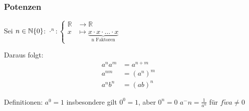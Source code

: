 \begin{multicols}{2}
\subsubsection{Potenzen}
	Sei $n \in \mathbb{N}\\\{0\}$:\space\space
	$
		\cdot^n : \begin{cases}
			\mathbb{R} &\to \mathbb{R} \\
			x &\mapsto \underbrace{x \cdot x \cdot \ldots \cdot x}_\text{n Faktoren}
		\end{cases}
	$
	
	Daraus folgt:
	\begin{align*}
		a^n a^m &= a ^{n+m} \\
		a^{nm} &= (a^n)^m \\
		a^n b^n &= (ab)^n
	\end{align*}

	Definitionen: \newline	
	$a^0 = 1$ insbesondere gilt $0^0=1$, aber $0^n=0$ \newline	
	$a^-n = \frac{1}{a^n}$ für $f\tilde{w} a \not= 0$
	
\end{multicols}



